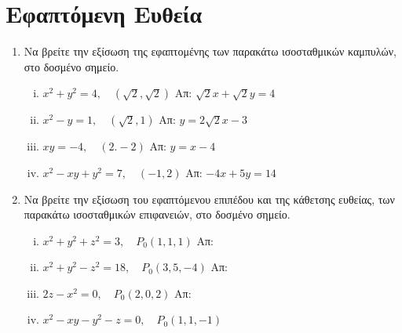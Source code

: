 




\geometry{left=15.63mm,right=15.63mm,top=28.25mm,bottom=34.25mm,
footskip=24.16mm,headsep=24.16mm}

\pagestyle{askhseis}
\everymath{\displaystyle}



\begin{center}
\minibox{\large\bfseries \textcolor{Col1}{Εφαπτόμενο Επίπεδο, Εφαπτόμενη και Κάθετη Ευθεία}}
\end{center}

\vspace{\baselineskip}

\section*{Εφαπτόμενη Ευθεία}



\begin{enumerate}
\item Να βρείτε την εξίσωση της εφαπτομένης των παρακάτω ισοσταθμικών καμπυλών, στο
  δοσμένο σημείο.
  \begin{enumerate}[i)]
    \item $ x^{2}+y^{2} = 4, \quad (\sqrt{2} , \sqrt{2}) $ 
      \hfill Απ: $ \sqrt{2} x + \sqrt{2} y = 4 $
    \item $ x^{2}-y=1, \quad (\sqrt{2} ,1) $ \hfill Απ: $ y=2 \sqrt{2} x - 3 $
    \item $ xy=-4, \quad (2.-2) $ \hfill Απ: $ y=x-4 $
    \item $ x^{2}-xy+y^{2}=7, \quad (-1,2) $ \hfill Απ: $ -4x+5y=14 $
  \end{enumerate}

\item Να βρείτε την εξίσωση του εφαπτόμενου επιπέδου και της κάθετσης ευθείας, των 
  παρακάτω ισοσταθμικών επιφανειών, στο δοσμένο σημείο.
  \begin{enumerate}[i)]
    \item $ x^{2}+y^{2}+z^{2}=3, \quad P_{0}(1,1,1) $ \hfill Απ:  
    \item $ x^{2}+y^{2}-z^{2}=18, \quad P_{0}(3,5,-4) $ \hfill Απ: 
    \item $ 2z-x^{2}=0, \quad P_{0}(2,0,2) $ \hfill Απ: 
    \item $ x^{2}-xy-y^{2}-z=0, \quad P_{0}(1,1,-1) $
  \end{enumerate}
\end{enumerate}


